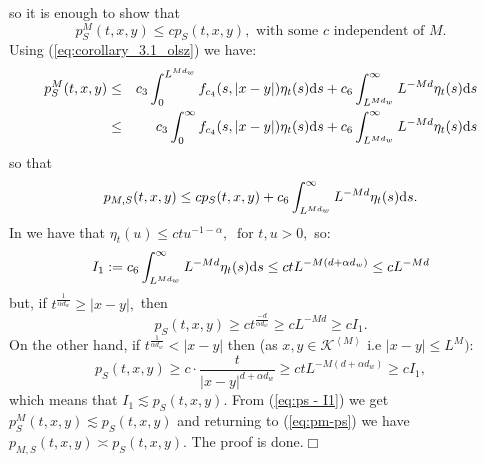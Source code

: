 \documentclass[11pt]{article}
\begin{document}
so it is enough to show that
$$
p^M_S(t,x,y) \leq cp_{S}(t, x,y), \mbox{ with some $c$  independent of $M.$}
$$
Using (\ref{eq:corollary_3.1_olsz}) we have:
\begin{eqnarray*}\label{upper t ver st}
p^M_S(t,x,y) & \leq & c_3\int_{0}^{L^{Md_{w}}}f_{c_4}(s,|x-y|)\eta_{t}(s){\rm d}s + c_6\int_{L^{Md_{w}}}^{\infty}L^{-Md}\eta_{t}(s){\rm d}s \\
 & \leq & c_3\int_{0}^{\infty}f_{c_4}(s,|x-y|)\eta_{t}(s){\rm d}s + c_6\int_{L^{Md_w}}^{\infty}L^{-Md}\eta_{t}(s){\rm d}s \\
\end{eqnarray*}
 so that
\begin{equation}\label{eq:ps - I1}
p_{M,S}(t,x,y) \leq cp_{S}(t,x,y) + c_6\int_{L^{Md_w}}^{\infty}L^{-Md}\eta_{t}(s){\rm d}s.
\end{equation}
In \cite[formula (9), p.4]{bib:BSS} we have that $\eta_{t}(u) \leq ctu^{-1-\alpha}, \ \mbox{ for } t,u >0,$ so:
$$
I_{1}:= c_6\int_{L^{Md_{w}}}^{\infty}L^{-Md}\eta_{t}(s){\rm d}s  \leq ctL^{-M(d+\alpha d_{w})} \leq cL^{-Md}
$$
but, if $t^{\frac{1}{\alpha d_{w}}} \geq |x-y|,$ then
$$
p_{S}(t,x,y) \geq ct^{\frac{-d}{\alpha d_{w}}} \geq cL^{-Md} \geq cI_{1}.
$$
On the other hand, if $t^{\frac{1}{\alpha d_{w}}} < |x-y|$ then (as $x,y \in \mathcal{K}^{\left\langle M \right\rangle}$ i.e $|x-y|  \leq L^{M})$:
$$
p_{S}(t,x,y) \geq c\cdot \frac{t}{|x-y|^{d+\alpha d_{w}}} \geq ctL^{-M(d+\alpha d_{w})} \geq cI_{1},
$$
which means that $I_1 \lesssim p_S(t,x,y).$ From (\ref{eq:ps - I1}) we get $p^M_S(t,x,y) \lesssim p_{S}(t,x,y)$ and returning to (\ref{eq:pm-ps}) we have $p_{M,S}(t,x,y) \asymp p_{S}(t, x,y).$ The proof is done.\hfill$\Box$
\end{document}
